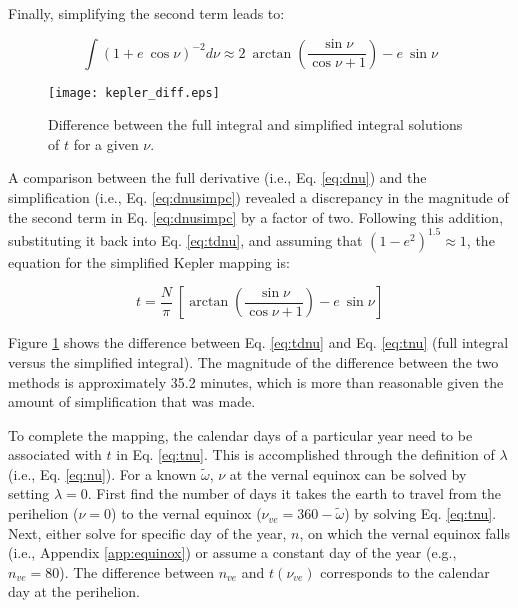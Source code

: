 \noindent Finally, simplifying the second term leads to:

\begin{equation}
\label{eq:dnusimpc}
		\int \left(1+e\:\cos\nu\right)^{-2} d\nu \approx 
			2\:\arctan \left( \frac{\sin\nu}{\cos\nu +1}
			\right) - e\:\sin\nu
\end{equation}

\begin{figure}[ht!]
    \texttt{[image: kepler\_diff.eps]}
    \caption{Difference between the full integral and simplified integral solutions of $t$ for a given $\nu$.}
    \label{fig:dkepler}
\end{figure}

\noindent A comparison between the full derivative (i.e., Eq. \ref{eq:dnu}) and the simplification (i.e., Eq. \ref{eq:dnusimpc}) revealed a discrepancy in the magnitude of the second term in Eq. \ref{eq:dnusimpc} by a factor of two. 
Following this addition, substituting it back into Eq. \ref{eq:tdnu}, and assuming that $(1-e^2)^{1.5} \approx 1$, the equation for the simplified Kepler mapping is:

\begin{equation}
\label{eq:tnu}
	t = \frac{N}{\pi}\:\left[ \arctan \left( \frac{\sin\nu}{\cos\nu + 1} \right) - e \:\sin\nu \right]
\end{equation}

Figure \ref{fig:dkepler} shows the difference between Eq. \ref{eq:tdnu} and Eq. \ref{eq:tnu} (full integral versus the simplified integral). 
The magnitude of the difference between the two methods is approximately 35.2 minutes, which is more than reasonable given the amount of simplification that was made.

To complete the mapping, the calendar days of a particular year need to be associated with $t$ in Eq. \ref{eq:tnu}. 
This is accomplished through the definition of $\lambda$ (i.e., Eq. \ref{eq:nu}). 
For a known $\tilde{\omega}$, $\nu$ at the vernal equinox can be solved by setting $\lambda = 0$. 
First find the number of days it takes the earth to travel from the perihelion ($\nu = 0$) to the vernal equinox ($\nu_{ve} = 360 - \tilde{\omega}$) by solving Eq. \ref{eq:tnu}. 
Next, either solve for specific day of the year, $n$, on which the vernal equinox falls (i.e., Appendix \ref{app:equinox}) or assume a constant day of the year (e.g., $n_{ve} = 80$). 
The difference between $n_{ve}$ and $t(\nu_{ve})$ corresponds to the calendar day at the perihelion.

